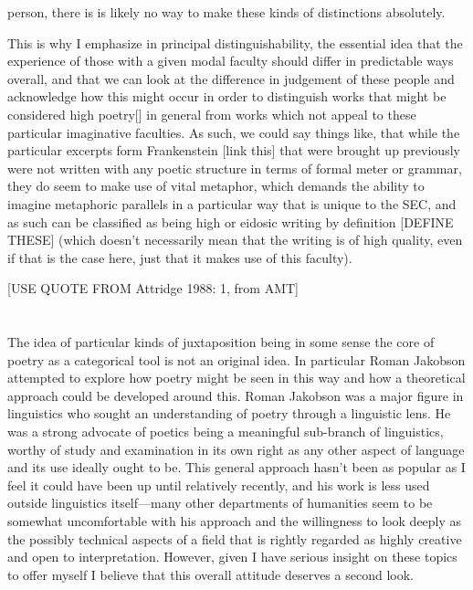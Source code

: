 \documentclass[]{article}
\begin{document}
person, there is is likely no way to make these kinds of distinctions absolutely.



This is why I emphasize in principal distinguishability, the essential idea that the experience of those with a given modal faculty should differ in predictable ways overall, and that we can look at the difference in judgement of these people and acknowledge how this might occur in order to distinguish works that might be considered high poetry[] in general from works which not appeal to these particular imaginative faculties. As such, we could say things like, that while the particular excerpts form Frankenstein [link this] that were brought up previously were not written with any poetic structure in terms of formal meter or grammar, they do seem to make use of vital metaphor, which demands the ability to imagine metaphoric parallels in a particular way that is unique to the SEC, and as such can be classified as being high or eidosic writing by definition [DEFINE THESE] (which doesn't necessarily mean that the writing is of high quality, even if that is the case here, just that it makes use of this faculty).



[USE QUOTE FROM Attridge 1988: 1, from AMT]



\section{}



The idea of particular kinds of juxtaposition being in some sense the core of poetry as a categorical tool is not an original idea. In particular Roman Jakobson attempted to explore how poetry might be seen in this way and how a theoretical approach could be developed around this. Roman Jakobson was a major figure in linguistics who sought an understanding of poetry through a linguistic lens. He was a strong advocate of poetics being a meaningful sub-branch of linguistics, worthy of study and examination in its own right as any other aspect of language and its use ideally ought to be. This general approach hasn't been as popular as I feel it could have been up until relatively recently, and his work is less used outside linguistics itself—many other departments of humanities seem to be somewhat uncomfortable with his approach and the willingness to look deeply as the possibly technical aspects of a field that is rightly regarded as highly creative and open to interpretation. However, given I have serious insight on these topics to offer myself I believe that this overall attitude deserves a second look.
\end{document}
